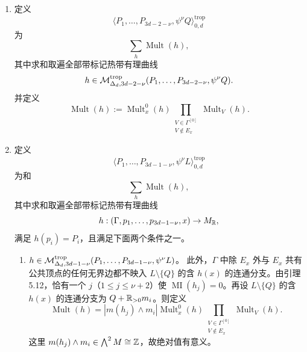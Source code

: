 \begin{definition}
\begin{enumerate}[label=(\arabic*),leftmargin=2.2em,itemsep=2pt]
\item 定义
  \[
    \bigl\langle P_1,\ldots,P_{3d-2-\nu},\psi^\nu Q\bigr\rangle^{\mathrm{trop}}_{0,d}
  \]
  为
  \[
    \sum_h\operatorname{Mult}(h),
  \]
  其中求和取遍全部带标记热带有理曲线
  \[
    h\in\mathcal{M}^{\mathrm{trop}}_{\Delta_d,3d-2-\nu}(P_1,\ldots,P_{3d-2-\nu},\psi^\nu Q).
  \]
  并定义
  \[
    \operatorname{Mult}(h):=\operatorname{Mult}^0_x(h)\prod_{\substack{V\in\Gamma^{[0]}\\ V\notin E_x}}\operatorname{Mult}_V(h).
  \]
\item 定义
  \[
    \bigl\langle P_1,\ldots,P_{3d-1-\nu},\psi^\nu L\bigr\rangle^{\mathrm{trop}}_{0,d}
  \]
  为和
  \[
    \sum_h\operatorname{Mult}(h),
  \]
  其中求和取遍全部带标记热带有理曲线
  \[
    h:(\Gamma,p_1,\ldots,p_{3d-1-\nu},x)\to M_{\mathbb{R}},
  \]
  满足 $h(p_i)=P_i$，且满足下面两个条件之一。
  \begin{enumerate}[label=(\alph*),leftmargin=2.2em,itemsep=2pt]
  \item $h\in\mathcal{M}^{\mathrm{trop}}_{\Delta_d,3d-1-\nu}(P_1,\ldots,P_{3d-1-\nu},\psi^\nu L)$。
    此外，$\Gamma$ 中除 $E_x$ 外与 $E_x$ 共有公共顶点的任何无界边都不映入 $L\setminus\{Q\}$ 的含 $h(x)$ 的连通分支。由引理 5.12，恰有一个 $j$（$1\le j\le\nu+2$）使 $\operatorname{MI}(h_j)=0$。再设 $L\setminus\{Q\}$ 的含 $h(x)$ 的连通分支为 $Q+\mathbb{R}_{>0}m_i$。则定义
    \[
      \operatorname{Mult}(h)=|m(h_j)\wedge m_i|\operatorname{Mult}^0_x(h)
      \prod_{\substack{V\in\Gamma^{[0]}\\ V\notin E_x}}\operatorname{Mult}_V(h).
    \]
    这里 $m(h_j)\wedge m_i\in\bigwedge^2M\cong\mathbb{Z}$，故绝对值有意义。


\end{enumerate}
\end{enumerate}
\end{definition}

